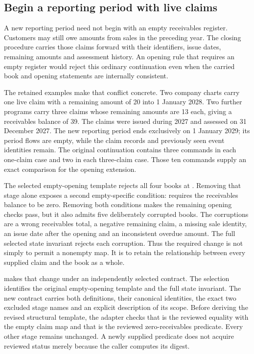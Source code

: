 \subsection{Begin a reporting period with live claims}
\label{sec:complete-claims-opening}

A new reporting period need not begin with an empty receivables register.
Customers may still owe amounts from sales in the preceding year. The closing
procedure carries those claims forward with their identifiers, issue dates,
remaining amounts and assessment history. An opening rule that requires an
empty register would reject this ordinary continuation even when the carried
book and opening statements are internally consistent.

The retained examples make that conflict concrete. Two company charts carry
one live claim with a remaining amount of 20 into 1 January 2028. Two further
programs carry three claims whose remaining amounts are 13 each, giving a
receivables balance of 39. The claims were issued during 2027 and assessed on
31 December 2027. The new reporting period ends exclusively on 1 January 2029;
its period flows are empty, while the claim records and previously seen event
identities remain. The original continuation contains three commands in each
one-claim case and two in each three-claim case. Those ten commands supply an
exact comparison for the opening extension.

The selected empty-opening template rejects all four books at
. Removing that stage alone exposes a second empty-specific
condition:  requires the receivables balance to be zero.
Removing both conditions makes the remaining opening checks pass, but it also
admits five deliberately corrupted books. The corruptions are a wrong
receivables total, a negative remaining claim, a missing sale identity, an
issue date after the opening and an inconsistent overdue amount. The full
selected state invariant rejects each corruption. Thus the required change
is not simply to permit a nonempty map. It is to retain the relationship
between every supplied claim and the book as a whole.

 makes that change under an independently
selected contract. The selection identifies the original empty-opening
template and the full state invariant. The new contract carries both
definitions, their canonical identities, the exact two excluded stage names
and an explicit description of its scope. Before deriving the revised
structural template, the adapter checks that  is the
reviewed equality with the empty claim map and that  is
the reviewed zero-receivables predicate. Every other stage remains unchanged.
A newly supplied predicate does not acquire reviewed status merely because
the caller computes its digest.

